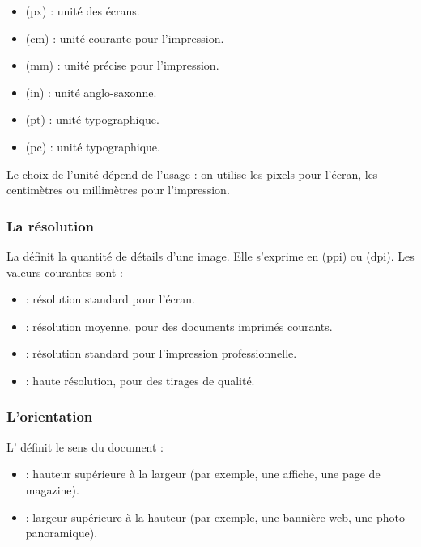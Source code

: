 \begin{itemize}
    \item {} (px) : unité des écrans.
    \item {} (cm) : unité courante pour l'impression.
    \item {} (mm) : unité précise pour l'impression.
    \item {} (in) : unité anglo-saxonne.
    \item {} (pt) : unité typographique.
    \item {} (pc) : unité typographique.
\end{itemize}

Le choix de l'unité dépend de l'usage : on utilise les pixels pour l'écran, les centimètres ou millimètres pour l'impression.

\subsubsection{La résolution}

La  définit la quantité de détails d'une image. Elle s'exprime en  (ppi) ou  (dpi). Les valeurs courantes sont :

\begin{itemize}
    \item {} : résolution standard pour l'écran.
    \item {} : résolution moyenne, pour des documents imprimés courants.
    \item {} : résolution standard pour l'impression professionnelle.
    \item {} : haute résolution, pour des tirages de qualité.
\end{itemize}

\subsubsection{L'orientation}

L' définit le sens du document :

\begin{itemize}
    \item {} : hauteur supérieure à la largeur (par exemple, une affiche, une page de magazine).
    \item {} : largeur supérieure à la hauteur (par exemple, une bannière web, une photo panoramique).
\end{itemize}

